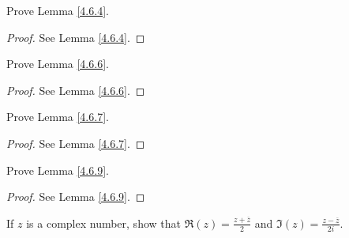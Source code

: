 \exercisesection

\begin{exercise}\label{ex 4.6.1}
    Prove Lemma \ref{4.6.4}.
\end{exercise}

\begin{proof}
    See Lemma \ref{4.6.4}.
\end{proof}

\begin{exercise}\label{ex 4.6.2}
    Prove Lemma \ref{4.6.6}.
\end{exercise}

\begin{proof}
    See Lemma \ref{4.6.6}.
\end{proof}

\begin{exercise}\label{ex 4.6.3}
    Prove Lemma \ref{4.6.7}.
\end{exercise}

\begin{proof}
    See Lemma \ref{4.6.7}.
\end{proof}

\begin{exercise}\label{ex 4.6.4}
    Prove Lemma \ref{4.6.9}.
\end{exercise}

\begin{proof}
    See Lemma \ref{4.6.9}.
\end{proof}

\begin{exercise}\label{ex 4.6.5}
    If \(z\) is a complex number, show that \(\Re(z) = \frac{z + \overline{z}}{2}\) and \(\Im(z) = \frac{z - \overline{z}}{2i}\).
\end{exercise}

